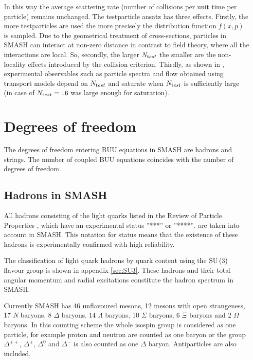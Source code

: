 In this way the average scattering rate (number of collisions per unit time per
particle) remains unchanged. The testparticle ansatz has three effects.
Firstly, the more testparticles are used the more precisely the distribution function
$\mathit{f}(x,p)$ is sampled. Due to the geometrical treatment of cross-sections,
particles in SMASH can interact at non-zero distance in contrast to field
theory, where all the interactions are local. So, secondly, the larger $N_{\textrm test}$
the smaller are the non-locality effects introduced by the collision criterion.
Thirdly, as shown in \cite{Cheng:2001dz}, experimental observables such as particle
spectra and flow obtained using transport models depend on $N_{\textrm test}$ and saturate
when $N_{\textrm test}$ is sufficiently large (in case of \cite{Cheng:2001dz}
$N_{\textrm test} = 16$ was large enough for saturation).

\section{Degrees of freedom}

The degrees of freedom entering BUU equations in SMASH are hadrons and
strings. The number of coupled BUU equations coincides with the number of degrees
of freedom.

\subsection{Hadrons in SMASH}

All hadrons consisting of the light quarks listed in the Review
of Particle Properties \cite{Agashe:2014kda}, which have an experimental status
''***'' or ''****'', are taken into account in SMASH. This notation for status means
that the existence of these hadrons is experimentally confirmed with high reliability.

The classification of light quark hadrons by quark content using the
$\mathrm{SU}\left({3}\right)$ flavour group is shown in appendix \ref{sec:SU3}.
These hadrons and their total angular momentum and radial excitations
constitute the hadron spectrum in SMASH.

Currently SMASH has 46 unflavoured mesons, 12 mesons with open strangeness,
17 $N$ baryons, 8 $\Delta$ baryons, 14 $\Lambda$ baryons, 10 $\Sigma$ baryons,
6 $\Xi$ baryons and 2 $\Omega$ baryons. In this counting scheme the whole isospin group
is considered as one particle, for example proton and neutron are counted as one
baryon or the group $\Delta^{++}$, $\Delta^{+}$, $\Delta^{0}$ and $\Delta^{-}$ is
also counted as one $\Delta$ baryon. Antiparticles are also included.

